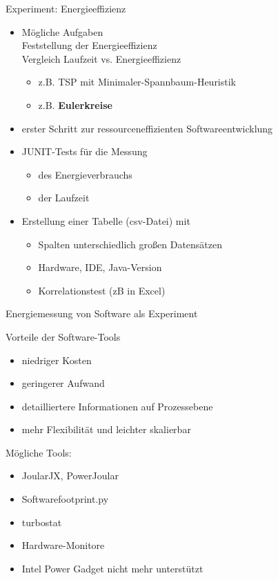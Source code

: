 \begin{frame}{Experiment: Energieeffizienz}
\begin{itemize}
	\item Mögliche Aufgaben\\
	      Feststellung der Energieeffizienz\\
				Vergleich Laufzeit vs. Energieeffizienz
\begin{itemize}
	\item z.B. TSP mit Minimaler-Spannbaum-Heuristik
	\item z.B. \textbf<2->{Eulerkreise}
\end{itemize}
	\item erster Schritt zur ressourceneffizienten Softwareentwicklung 
	\item JUNIT-Tests für die Messung 
	\begin{itemize}
		\item  des Energieverbrauchs
		\item  der Laufzeit
\end{itemize}
	\item Erstellung einer Tabelle  (csv-Datei)  mit
	\begin{itemize}
		\item Spalten unterschiedlich großen Datensätzen
		\item Hardware, IDE,	Java-Version
		\item Korrelationstest (zB in Excel)
			
\end{itemize}
\end{itemize} 
\end{frame}


\begin{frame}{Energiemessung von Software als Experiment}

Vorteile der   Software-Tools 
\begin{itemize}
    \item niedriger Kosten 
    \item geringerer  Aufwand 
		\item detailliertere Informationen auf Prozessebene
    \item  mehr Flexibilität und leichter skalierbar
\end{itemize}
 Mögliche Tools:
\begin{itemize}
	\item JoularJX, PowerJoular
	\item Softwarefootprint.py
	\item turbostat
	\item Hardware-Monitore
	\item Intel Power Gadget \dotfill nicht mehr unterstützt
\end{itemize}
\end{frame}

